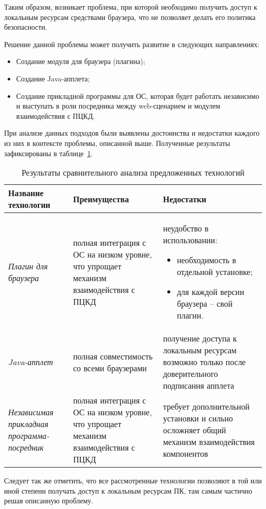 Таким образом, возникает проблема, при которой необходимо получить доступ к
локальным ресурсам средствами браузера, что не позволяет делать его политика
безопасности.

Решение данной проблемы может получить развитие в следующих направлениях:
\begin{itemize}
  \item Создание модуля для браузера (плагина);
  \item Создание Java-апплета;
  \item Создание прикладной программы для ОС, которая будет работать независимо
  и выступать в роли посредника между web-сценарием и модулем взаимодействия с
  ПЦКД.
\end{itemize}

При анализе данных подходов были выявлены достоинства и недостатки каждого из
них в контексте проблемы, описанной выше. Полученные результаты зафиксированы в
таблице~\ref{tab:1}.

\begin{table}[ht]
  \small
  \centering
  \begin{tabular}{|p{3cm}|p{6cm}|p{7cm}|}
    \hline
	\textbf{Название технологии} & \textbf{Преимущества} & \textbf{Недостатки} \\
	\hline 
	\textit{Плагин для браузера} & полная интеграция с ОС на низком уровне, что
	упрощает механизм взаимодействия с ПЦКД & неудобство в использовании:
	\begin{itemize}
	  \item необходимость в отдельной установке;
	  \item для каждой версии браузера -- свой плагин.
	\end{itemize}  \\ \hline
	\textit{Java-апплет} & полная совместимость со всеми браузерами & получение
	доступа к локальным ресурсам возможно только после доверительного подписания апплета \\
	\hline 
	\textit{Независимая прикладная программа-посредник} & полная интеграция с ОС на
	 низком уровне, что упрощает механизм взаимодействия с ПЦКД & требует
	 дополнительной установки и сильно осложняет общий механизм взаимодействия
	 компонентов \\ \hline
  \end{tabular}
  \caption{Результаты сравнительного анализа предложенных технологий}
  \label{tab:1}
\end{table}

Следует так же отметить, что все рассмотренные
технологии позволяют в той или иной степени получать доступ к локальным ресурсам
ПК, там самым частично решая описанную проблему.


